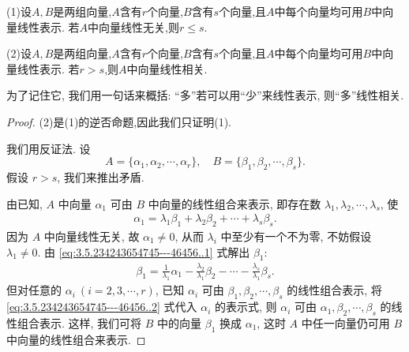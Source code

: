 \documentclass[../../main.tex]{subfiles}%
\begin{document}
\begin{lemma}[替换定理]\label{lemma:替换定理}
(1)设\(A,B\)是两组向量,\(A\)含有\(r\)个向量,\(B\)含有\(s\)个向量,且\(A\)中每个向量均可用\(B\)中向量线性表示. 若\(A\)中向量线性无关,则\(r\leqslant  s\).

(2)设\(A,B\)是两组向量,\(A\)含有\(r\)个向量,\(B\)含有\(s\)个向量,且\(A\)中每个向量均可用\(B\)中向量线性表示. 若\(r > s\),则\(A\)中向量线性相关.
\end{lemma}
\begin{note}
为了记住它, 我们用一句话来概括: “多”若可以用“少”来线性表示, 则“多”线性相关.
\end{note}
\begin{proof}

(2)是(1)的逆否命题,因此我们只证明(1).

我们用反证法. 设
\[
A = \{\alpha_1, \alpha_2, \cdots, \alpha_r\},
\quad
B = \{\beta_1, \beta_2, \cdots, \beta_s\}.
\]
假设 \( r > s \), 我们来推出矛盾.

由已知, \( A \) 中向量 \( \alpha_1 \) 可由 \( B \) 中向量的线性组合来表示, 即存在数 \( \lambda_1, \lambda_2, \cdots, \lambda_s \), 使
\begin{align}
\alpha_1 = \lambda_1\beta_1 + \lambda_2\beta_2 + \cdots + \lambda_s\beta_s. \label{eq:3.5.234243654745---46456..1}
\end{align}
因为 \( A \) 中向量线性无关, 故 \( \alpha_1 \neq 0 \), 从而 \( \lambda_i \) 中至少有一个不为零, 不妨假设 \( \lambda_1 \neq 0 \). 由 \eqref{eq:3.5.234243654745---46456..1} 式解出 \( \beta_1 \):
\begin{align}
\beta_1 = \frac{1}{\lambda_1}\alpha_1 - \frac{\lambda_2}{\lambda_1}\beta_2 - \cdots - \frac{\lambda_s}{\lambda_1}\beta_s. \label{eq:3.5.234243654745---46456..2}
\end{align}
但对任意的 \( \alpha_i \ (i = 2, 3, \cdots, r) \), 已知 \( \alpha_i \) 可由 \( \beta_1, \beta_2, \cdots, \beta_s \) 的线性组合表示, 将 \eqref{eq:3.5.234243654745---46456..2} 式代入 \( \alpha_i \) 的表示式, 则 \( \alpha_i \) 可由 \( \alpha_1, \beta_2, \cdots, \beta_s \) 的线性组合表示. 这样, 我们可将 \( B \) 中的向量 \( \beta_1 \) 换成 \( \alpha_1 \), 这时 \( A \) 中任一向量仍可用 \( B \) 中向量的线性组合来表示.


\end{proof}
\end{document}
